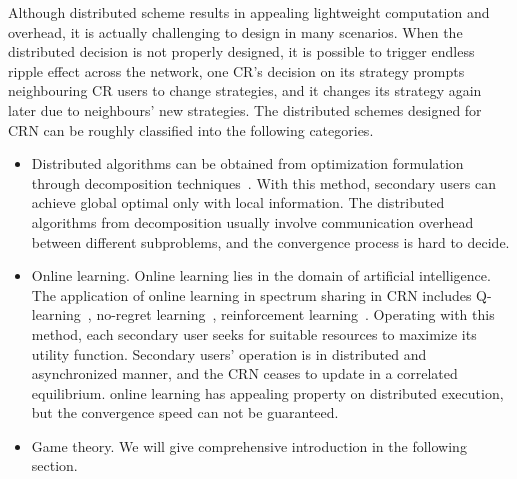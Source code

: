 Although distributed scheme results in appealing lightweight computation and overhead, it is actually challenging to design in many scenarios.
When the distributed decision is not properly designed, it is possible to trigger endless ripple effect across the network, \ie one CR's decision on its strategy prompts neighbouring CR users to change strategies, and it changes its strategy again later due to neighbours' new strategies.
%
The distributed schemes designed for CRN can be roughly classified into the following categories.
\begin{itemize}
\item Distributed algorithms can be obtained from optimization formulation through decomposition techniques~\cite{Palomar06atutorial}.
With this method, secondary users can achieve global optimal only with local information.
The distributed algorithms from decomposition usually involve communication overhead between different subproblems, and the convergence process is hard to decide.



\item Online learning.
Online learning lies in the domain of artificial intelligence. 
The application of online learning in spectrum sharing in CRN includes Q-learning~\cite{reinforcement_learning_crn_wcnc_2013}, no-regret learning~\cite{hart00correlatedeq,qlearning_huang}, reinforcement learning~\cite{reinforcement_learning_crn_2011}.
Operating with this method, each secondary user seeks for suitable resources to maximize its utility function.
Secondary users' operation is in distributed and asynchronized manner, and the CRN ceases to update in a correlated equilibrium.
online learning has appealing property on distributed execution, but the convergence speed can not be guaranteed.

\item Game theory.
We will give comprehensive introduction in the following section.

\end{itemize}



